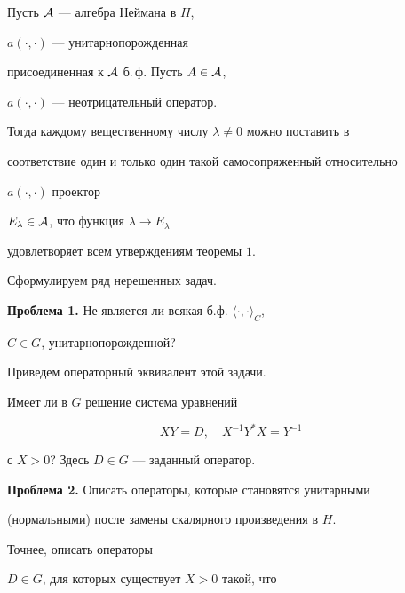 \begin{thm}


Пусть $\cal A$ --- алгебра Неймана в $H$,


$a(\cdot,\cdot)$ --- унитарнопорожденная


присоединенная к $\cal A$ б.\,ф. Пусть $A\in \cal A$,


$a(\cdot,\cdot)$ --- неотрицательный оператор.


Тогда каждому вещественному числу $\lambda\ne 0$ можно поставить в


соответствие один и только один такой самосопряженный относительно


$a(\cdot,\cdot)$ проектор


$E_{\lambda}\in \cal A$, что функция $\lambda\to E_{\lambda}$


удовлетворяет всем утверждениям теоремы $1$.


\end{thm}





Сформулируем ряд нерешенных задач.


\medskip





{\bf Проблема 1.} Не является ли всякая б.ф. $\langle\cdot,\cdot \rangle_{C}$,


$C\in G$, унитарнопорожденной?


\medskip





Приведем операторный эквивалент этой задачи.


Имеет ли в $G$ решение система уравнений


\begin{equation}


XY=D, \quad X^{-1}Y^{*}X=Y^{-1}


\end{equation}


с $X>0$? Здесь $D\in G$ --- заданный оператор.


\medskip





{\bf Проблема 2.} Описать операторы, которые становятся унитарными


(нормальными) после замены скалярного произведения в $H$.


Точнее, описать операторы


$D\in G$, для которых существует $X>0$ такой, что


